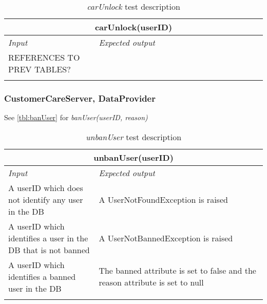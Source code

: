 \begin{longtable}{p{0.35\linewidth}p{0.65\linewidth}}
\multicolumn{2}{c}{\textbf{carUnlock(userID)}} \\
\toprule
\emph{Input} & \emph{Expected output} \\
\midrule
REFERENCES TO PREV TABLES?\\
\bottomrule
\caption{\emph{carUnlock} test description}
\end{longtable}

\subsubsection{CustomerCareServer, DataProvider}
See \autoref{tbl:banUser} for \emph{banUser(userID, reason)}

\begin{longtable}{p{0.35\linewidth}p{0.65\linewidth}}
\multicolumn{2}{c}{\textbf{unbanUser(userID)}} \\
\toprule
\emph{Input} & \emph{Expected output} \\
\midrule
A userID which does not identify any user in the DB & A UserNotFoundException is raised\\
\midrule
A userID which identifies a user in the DB that is not banned & A UserNotBannedException is raised\\
\midrule
A userID which identifies a banned user in the DB & The banned attribute is set to false and the reason attribute is set to null \\
\bottomrule
\caption{\emph{unbanUser} test description}
\end{longtable}


